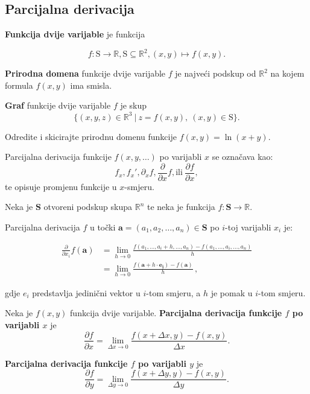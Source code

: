 \subsection{Parcijalna derivacija}

\textbf{Funkcija dvije varijable} je funkcija

$$
f: \mathrm{S} \to \mathbb{R}, \mathrm{S} \subseteq \mathbb{R}^2, (x, y) \mapsto f(x,y).
$$

\textbf{Prirodna domena} funkcije dvije varijable $f$ je najveći podskup od
$\mathbb{R}^2$ na kojem formula $f(x,y)$ ima smisla.

\textbf{Graf} funkcije dvije varijable $f$ je skup
$$
  \{(x,y,z)\in\mathbb{R}^3\ |\ z=f(x,y),\ (x,y)\in\mathrm{S}\}.
$$

\begin{example}
  Odredite i skicirajte prirodnu domenu funkcije $f(x,y)=\ln(x+y)$.
\end{example}

Parcijalna derivacija funkcije $f(x,y,\dots)$ po varijabli $x$ se označava kao:
$$
f_x, f_x', \partial_x f, \frac{\partial}{\partial x}f, \text{ili}\ \frac{\partial f}{\partial x},
$$
te opisuje promjenu funkcije u $x$-smjeru.

\begin{definition}
    \label{def:diff_partial}
    Neka je $\mathbf{S}$ otvoreni podskup skupa $\mathbb{R}^n$ te neka je
    funkcija $f:\mathbf{S}\to \mathbb{R}$.

    Parcijalna derivacija $f$ u točki $\mathbf{a}=(a_1, a_2, \dots,
    a_n)\in\mathbf{S}$ po $i$-toj varijabli $x_i$ je:
    
    \begin{align*}
        \frac{\partial }{\partial x_i }f(\mathbf{a}) & = \lim_{h \to 0} \frac{f(a_1, \ldots , a_i+h, \ldots ,a_n) -
        f(a_1, \ldots, a_i, \dots ,a_n)}{h} \\ 
        & = \lim_{h \to 0} \frac{f(\mathbf{a}+h \cdot \mathbf{e_i}) - f(\mathbf{a})}{h}\,,
    \end{align*}

    gdje $e_i$ predstavlja jedinični vektor u $i$-tom smjeru, a $h$ je pomak u
    $i$-tom smjeru.
\end{definition}

Neka je $f(x,y)$ funkcija dvije varijable. \textbf{Parcijalna derivacija
funkcije $f$ po varijabli $x$} je
$$
  \frac{\partial f}{\partial x} = \lim_{\Delta x\to 0} \frac{f(x+\Delta x,y)-f(x,y)}{\Delta x}.
$$

\textbf{Parcijalna derivacija funkcije $f$ po varijabli $y$} je
$$
  \frac{\partial f}{\partial y} = \lim_{\Delta y\to 0} \frac{f(x+\Delta y,y)-f(x,y)}{\Delta y}.
$$

